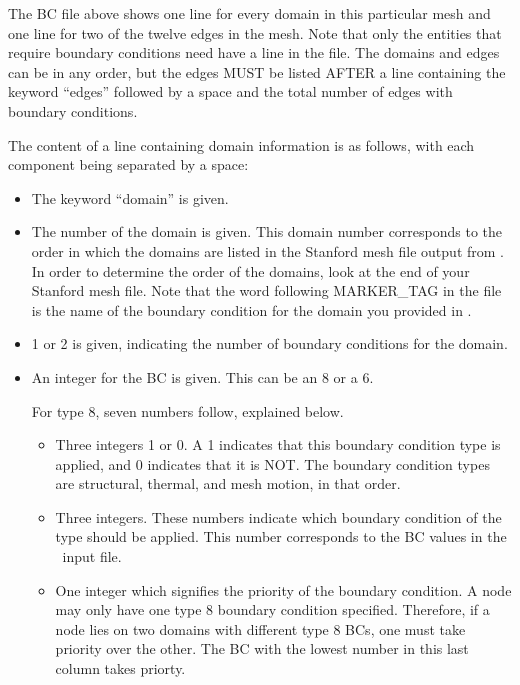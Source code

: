 The BC file above shows one line for every domain in this particular mesh and one line for two of the twelve edges in the mesh. Note that only the entities that require boundary conditions need have a line in the file. The domains and edges can be in any order, but the edges MUST be listed AFTER a line containing the keyword ``edges'' followed by a space and the total number of edges with boundary conditions.

The content of a line containing domain information is as follows, with each component being separated by a space:

\begin{itemize}
	\item The keyword ``domain'' is given.
	\item The number of the domain is given. This domain number corresponds to the order in which the domains are listed in the Stanford mesh file output from . In order to determine the order of the domains, look at the end of your Stanford mesh file. Note that the word following MARKER\_TAG in the file is the name of the boundary condition for the domain you provided in .
	\item 1 or 2 is given, indicating the number of boundary conditions for the domain. 
	\item An integer for the BC is given. This can be an 8 or a 6. 
	
	For type 8, seven numbers follow, explained below.
	\begin{itemize}
		\item Three integers 1 or 0. A 1 indicates that this boundary condition type is applied, and 0 indicates that it is NOT. The boundary condition types are structural, thermal, and mesh motion, in that order.  
		\item Three integers. These numbers indicate which boundary condition of the type should be applied. This number corresponds to the BC values in the \rocfrac\, input file. 
		\item One integer which signifies the priority of the boundary condition. A node may only have one type 8 boundary condition specified. Therefore, if a node lies on two domains with different type 8 BCs, one must take priority over the other. The BC with the lowest number in this last column takes priorty.
		

\end{itemize}
\end{itemize}
